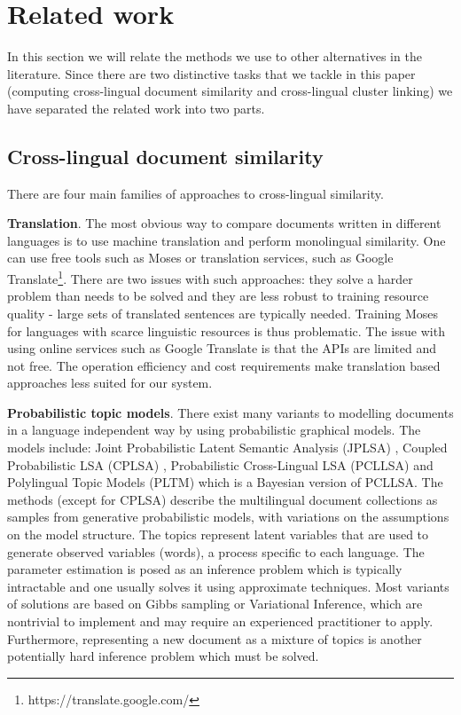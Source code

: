 \documentclass[twoside,11pt]{article}
\begin{document}
\section{Related work}

In this section we will relate the methods we use to other alternatives in the literature. Since there are two distinctive tasks that we tackle in this paper (computing cross-lingual document similarity and cross-lingual cluster linking) we have separated the related work into two parts.

\subsection{Cross-lingual document similarity}

There are four main families of approaches to cross-lingual similarity.

\textbf{Translation}. The most obvious way to compare documents written in different languages is to use machine translation and perform monolingual similarity. One can use free tools such as Moses  or translation services, such as Google Translate\footnote{https://translate.google.com/}. There are two issues with such approaches: they solve a harder problem than needs to be solved and they are less robust to training resource quality - large sets of translated sentences are typically needed. Training Moses for languages with scarce linguistic resources is thus problematic. The issue with using online services such as Google Translate is that the APIs are limited and not free. The operation efficiency and cost requirements make translation based approaches less suited for our system.

\textbf{Probabilistic topic models}. There exist many variants to modelling documents in a language independent way by using probabilistic graphical models. The models include:  Joint Probabilistic Latent Semantic Analysis (JPLSA) , Coupled Probabilistic LSA (CPLSA) \cite{platt2010translingual}, Probabilistic Cross-Lingual LSA (PCLLSA)\cite{PCL_LSA} and Polylingual Topic Models (PLTM)  which is a Bayesian version of PCLLSA. The methods (except for CPLSA) describe the multilingual document collections as samples from generative probabilistic models, with variations on the assumptions on the model structure. The topics represent latent variables that are used to generate observed variables (words), a process specific to each language. The parameter estimation is posed as an inference problem which is typically intractable and one usually solves it using approximate techniques. Most variants of solutions are based on Gibbs sampling or Variational Inference, which are nontrivial to implement and may require an experienced practitioner to apply. Furthermore, representing a new document as a mixture of topics is another potentially hard inference problem which must be solved.
\end{document}
